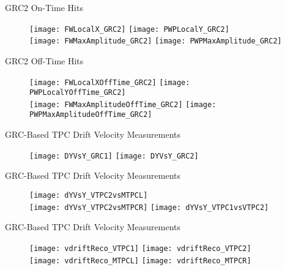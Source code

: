 \documentclass[11pt]{beamer}
\begin{document}
\begin{frame}{GRC2 On-Time Hits}
\begin{figure}
\centering
\texttt{[image: FWLocalX\_GRC2]}
\texttt{[image: PWPLocalY\_GRC2]} \\
\texttt{[image: FWMaxAmplitude\_GRC2]}
\texttt{[image: PWPMaxAmplitude\_GRC2]} 
\end{figure}
\end{frame}

\begin{frame}{GRC2 Off-Time Hits}
\begin{figure}
\centering
\texttt{[image: FWLocalXOffTime\_GRC2]}
\texttt{[image: PWPLocalYOffTime\_GRC2]} \\
\texttt{[image: FWMaxAmplitudeOffTime\_GRC2]}
\texttt{[image: PWPMaxAmplitudeOffTime\_GRC2]} 
\end{figure}
\end{frame}

\begin{frame}{GRC-Based TPC Drift Velocity Measurements}
\begin{figure}
\centering
\texttt{[image: DYVsY\_GRC1]}
\texttt{[image: DYVsY\_GRC2]} \\
\end{figure}
\end{frame}

\begin{frame}{GRC-Based TPC Drift Velocity Measurements}
\begin{figure}
\centering
\texttt{[image: dYVsY\_VTPC2vsMTPCL]} \\
\texttt{[image: dYVsY\_VTPC2vsMTPCR]}
\texttt{[image: dYVsY\_VTPC1vsVTPC2]} 
\end{figure}
\end{frame}

\begin{frame}{GRC-Based TPC Drift Velocity Measurements}
\begin{figure}
\centering
\texttt{[image: vdriftReco\_VTPC1]}
\texttt{[image: vdriftReco\_VTPC2]} \\
\texttt{[image: vdriftReco\_MTPCL]}
\texttt{[image: vdriftReco\_MTPCR]} 
\end{figure}
\end{frame}
\end{document}
